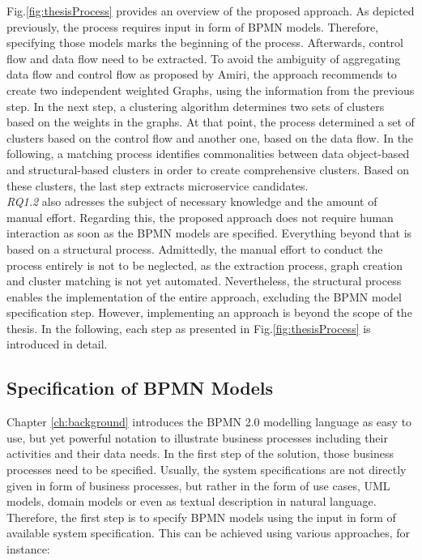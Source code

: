 \noindent
Fig.\ref{fig:thesisProcess} provides an overview of the proposed approach. As depicted previously, the process requires input in form of BPMN models. Therefore, specifying those models marks the beginning of the process. Afterwards, control flow and data flow need to be extracted. To avoid the ambiguity of aggregating data flow and control flow as proposed by Amiri\cite{ObjectAwareAmiri}, the approach recommends to create two independent weighted Graphs, using the information from the previous step. In the next step, a clustering algorithm determines two sets of clusters based on the weights in the graphs. At that point, the process determined a set of clusters based on the control flow and another one, based on the data flow. In the following, a matching process identifies commonalities between data object-based and structural-based clusters in order to create comprehensive clusters. Based on these clusters, the last step extracts microservice candidates. \\
\textit{RQ1.2} also adresses the subject of necessary knowledge and the amount of manual effort. Regarding this, the proposed approach does not require human interaction as soon as the BPMN models are specified. Everything beyond that is based on a structural process.
Admittedly, the manual effort to conduct the process entirely is not to be neglected, as the extraction process, graph creation and cluster matching is not yet automated. Nevertheless, the structural process enables the implementation of the entire approach, excluding the BPMN model specification step. However, implementing an approach is beyond the scope of the thesis. In the following, each step as presented in Fig.\ref{fig:thesisProcess} is introduced in detail.


\subsection{Specification of BPMN Models}
\label{sec:Solution:SpecifyBPMN}
Chapter \ref{ch:background} introduces the BPMN 2.0 modelling language as easy to use, but yet powerful notation to illustrate business processes including their activities and their data needs.
In the first step of the solution, those business processes need to be specified. Usually, the system specifications are not directly given in form of business processes, but rather in the form of use cases, UML models, domain models or even as textual description in natural language. Therefore, the first step is to specify BPMN models using the input in form of available system specification. This can be achieved using various approaches, for instance: \\





